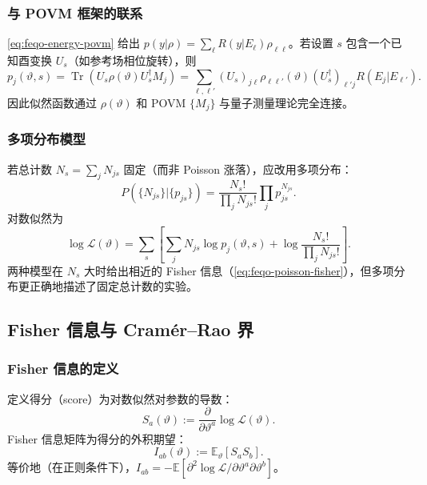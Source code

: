 \subsubsection{与 POVM 框架的联系}

\cref{eq:feqo-energy-povm} 给出 $p(y|\rho)=\sum_\ell R(y|E_\ell)\rho_{\ell\ell}$。若设置 $s$ 包含一个已知酉变换 $U_s$（如参考场相位旋转），则
\begin{equation}
p_j(\vartheta,s)=\operatorname{Tr}(U_s\rho(\vartheta)U_s^\dagger M_j)
=\sum_{\ell,\ell'}(U_s)_{j\ell}\rho_{\ell\ell'}(\vartheta)(U_s^\dagger)_{\ell'j}R(E_j|E_{\ell'}).
\label{eq:feqo-phase-readout-likelihood}
\end{equation}
因此似然函数通过 $\rho(\vartheta)$ 和 POVM $\{M_j\}$ 与量子测量理论完全连接。

\subsubsection{多项分布模型}

若总计数 $N_s=\sum_j N_{js}$ 固定（而非 Poisson 涨落），应改用多项分布：
\begin{equation}
P(\{N_{js}\}|\{p_{js}\})=\frac{N_s!}{\prod_j N_{js}!}\prod_j p_{js}^{N_{js}}.
\label{eq:feqo-multinomial}
\end{equation}
对数似然为
\begin{equation}
\log\mathcal{L}(\vartheta)=\sum_s\left[\sum_j N_{js}\log p_j(\vartheta,s)+\log\frac{N_s!}{\prod_j N_{js}!}\right].
\label{eq:feqo-multinomial-likelihood}
\end{equation}
两种模型在 $N_s$ 大时给出相近的 Fisher 信息（\cref{eq:feqo-poisson-fisher}），但多项分布更正确地描述了固定总计数的实验。

\subsection{Fisher 信息与 Cram\'er--Rao 界}

\subsubsection{Fisher 信息的定义}

定义得分（score）为对数似然对参数的导数：
\begin{equation}
S_a(\vartheta):=\frac{\partial}{\partial\vartheta^a}\log\mathcal{L}(\vartheta).
\label{eq:feqo-score}
\end{equation}
Fisher 信息矩阵为得分的外积期望：
\begin{equation}
I_{ab}(\vartheta):=\mathbb{E}_\vartheta[S_a S_b].
\label{eq:feqo-fisher-def}
\end{equation}
等价地（在正则条件下），$I_{ab}=-\mathbb{E}[\partial^2\log\mathcal{L}/\partial\vartheta^a\partial\vartheta^b]$。


